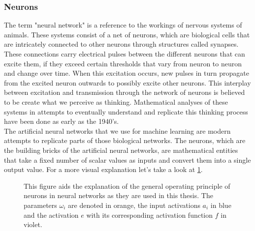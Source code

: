 \subsubsection{Neurons}
The term "neural network" is a reference to the workings of nervous systems of animals. These systems consist of a net of neurons, which are biological cells that are intricately connected to other neurons through structures called synapses. These connections carry electrical pulses between the different neurons that can excite them, if they exceed certain thresholds that vary from neuron to neuron and change over time. When this excitation occurs, new pulses in turn propagate from the excited neuron outwards to possibly excite other neurons. This interplay between excitation and transmission through the network of neurons is believed to be create what we perceive as thinking. Mathematical analyses of these systems in attempts to eventually understand and replicate this thinking process have been done as early as the 1940's.\cite{A_logical_calculus_of_the_ideas_immanent_in_nervous_activity}\\
The artificial neural networks that we use for machine learning are modern attempts to replicate parts of those biological networks. The neurons, which are the building bricks of the artificial neural networks, are mathematical entities that take a fixed number of scalar values as inputs and convert them into a single output value. For a more visual explanation let's take a look at \cref{fig:Neuron_explanation}.
\begin{figure}
	\centering
	
	\caption{This figure aids the explanation of the general operating principle of neurons in neural networks as they are used in this thesis. The parameters $\omega_i$ are denoted in orange, the input activations $a_i$ in blue and the activation $e$ with its corresponding activation function $f$ in violet.}
	\label{fig:Neuron_explanation}
\end{figure}
